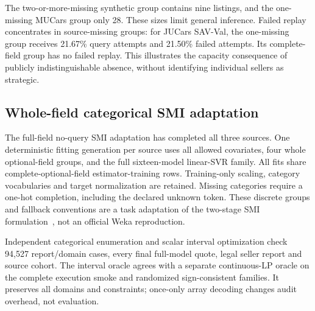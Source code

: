 \documentclass[10pt,journal]{IEEEtran}
\begin{document}
The two-or-more-missing synthetic group contains nine listings, and the
one-missing MUCars group only 28. These sizes limit general inference.
Failed replay concentrates in source-missing groups: for JUCars SAV-Val,
the one-missing group receives 21.67\% query attempts and 21.50\%
failed attempts. Its complete-field group has no failed replay.
This illustrates the capacity consequence of publicly indistinguishable
absence, without identifying individual sellers as strategic.

\subsection{Whole-field categorical SMI adaptation}
The full-field no-query SMI adaptation has completed all three sources.
One deterministic fitting generation per source uses all allowed covariates,
four whole optional-field groups, and the full sixteen-model linear-SVR
family. All fits share complete-optional-field estimator-training rows.
Training-only scaling, category vocabularies and target normalization are
retained. Missing categories require a one-hot completion, including the
declared unknown token. These discrete groups and fallback conventions
are a task adaptation of the two-stage SMI formulation~\cite{zhang2020strategic},
not an official Weka reproduction.

Independent categorical enumeration and scalar interval optimization check
94,527 report/domain cases, every final full-model quote, legal seller report
and source cohort. The interval oracle agrees with a separate continuous-LP
oracle on the complete execution smoke and randomized sign-consistent families.
It preserves all domains and constraints; once-only array decoding changes
audit overhead, not evaluation.
\end{document}
